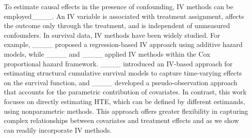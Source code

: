  

To estimate causal effects in the presence of confounding, IV methods can be employed____. An IV variable is associated with treatment assignment, affects the outcome only through the treatment, and is independent of unmeasured confounders. In survival data, IV methods have been widely studied. For example, ____ proposed a regression-based IV approach using additive hazard models, while ____ and ____ applied IV methods within the Cox proportional hazard framework. ____ introduced an IV-based approach for estimating structural cumulative survival models to capture time-varying effects on the survival function, and ____ developed a pseudo-observation approach that accounts for the parametric contribution of covariates. In contrast, this work focuses on directly estimating HTE, which can be defined by different estimands, using nonparametric methods.  This approach offers greater flexibility in capturing complex relationships between covariates and treatment effects and as we show can readily incorporate IV methods.